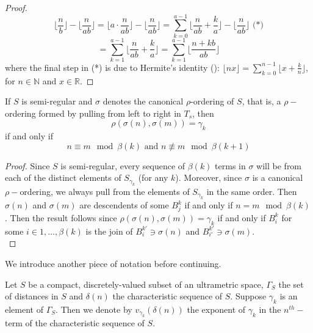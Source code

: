 \begin{proof}
\[\lfloor\frac{n}{b} \rfloor - \lfloor \frac{n}{ab} \rfloor = \lfloor a \cdot \frac{n}{ab} \rfloor - \lfloor \frac{n}{ab} \rfloor  = \sum_{k=0}^{a-1} \lfloor \frac{n}{ab} + \frac{k}{a} \rfloor - \lfloor \frac{n}{ab} \rfloor \text{ (*)}\]
\[= \sum_{k=1}^{a-1} \lfloor \frac{n}{ab} + \frac{k}{a} \rfloor = \sum_{k=1}^{a-1} \lfloor \frac{n + kb}{ab} \rfloor \]
where the final step in (*) is due to Hermite's identity (\cite{st}): $\lfloor nx \rfloor = \sum_{k=0}^{n-1} \lfloor x + \frac{k}{n} \rfloor$, for $n \in \mathbb{N}$ and $x \in \mathbb{R}$.
\end{proof}                                                                                                              

\begin{lemma}
If $S$ is semi-regular and $\sigma$ denotes the canonical $\rho$-ordering of $S$, that is, a $\rho-$ordering formed by pulling from left to right in $T_s$, then \[\rho(\sigma(n),\sigma(m))=\gamma_k\] if and only if \[ n \equiv m \mod \beta(k) \text{  and } n \not\equiv m \mod \beta(k+1)\]
\end{lemma}

\begin{proof}
Since $S$ is semi-regular, every sequence of $\beta(k)$ terms in $\sigma$ will be from each of the distinct elements of $S_{\gamma_k}$ (for any $k$). Moreover, since $\sigma$ is a canonical $\rho-$ordering, we always pull from the elements of $S_{\gamma_k}$ in the same order. Then $\sigma(n)$ and $\sigma(m)$ are descendents of some $B^k_j$ if and only if $n = m \mod \beta(k)$. Then the result follows since $\rho(\sigma(n),\sigma(m))=\gamma_k$ if and only if $B^k_i$ for some $i \in 1,\ldots, \beta(k)$ is the join of $B^{k'}_i \ni \sigma(n)$ and $B^{k'}_{i'} \ni \sigma(m)$.  \\ 
\end{proof}

We introduce another piece of notation before continuing.

\begin{notation}
	Let $S$ be a compact, discretely-valued subset of an ultrametric space, $\Gamma_S$ the set of distances in $S$ and $\delta(n)$ the characteristic sequence of $S$. Suppose $\gamma_k$ is an element of $\Gamma_S$. Then we denote by $v_{\gamma_k}(\delta(n))$ the exponent of $\gamma_k$ in the $n^{th}-$term of the characteristic sequence of $S$.
\end{notation}

